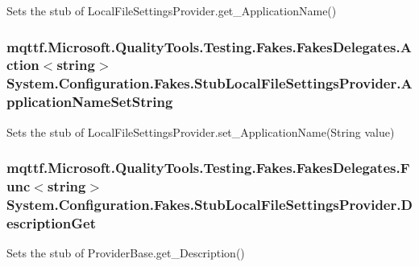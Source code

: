 Sets the stub of Local\-File\-Settings\-Provider.\-get\-\_\-\-Application\-Name()

\hypertarget{class_system_1_1_configuration_1_1_fakes_1_1_stub_local_file_settings_provider_a9fa455de5bc499b9344ad8c24a168488}{
\subsubsection[{Application\-Name\-Set\-String}]{\setlength{\rightskip}{0pt plus 5cm}mqttf.\-Microsoft.\-Quality\-Tools.\-Testing.\-Fakes.\-Fakes\-Delegates.\-Action$<$string$>$ System.\-Configuration.\-Fakes.\-Stub\-Local\-File\-Settings\-Provider.\-Application\-Name\-Set\-String}}\label{class_system_1_1_configuration_1_1_fakes_1_1_stub_local_file_settings_provider_a9fa455de5bc499b9344ad8c24a168488}


Sets the stub of Local\-File\-Settings\-Provider.\-set\-\_\-\-Application\-Name(\-String value)

\hypertarget{class_system_1_1_configuration_1_1_fakes_1_1_stub_local_file_settings_provider_a6b2f36612fede308e747ff0224a2774f}{
\subsubsection[{Description\-Get}]{\setlength{\rightskip}{0pt plus 5cm}mqttf.\-Microsoft.\-Quality\-Tools.\-Testing.\-Fakes.\-Fakes\-Delegates.\-Func$<$string$>$ System.\-Configuration.\-Fakes.\-Stub\-Local\-File\-Settings\-Provider.\-Description\-Get}}\label{class_system_1_1_configuration_1_1_fakes_1_1_stub_local_file_settings_provider_a6b2f36612fede308e747ff0224a2774f}


Sets the stub of Provider\-Base.\-get\-\_\-\-Description()

